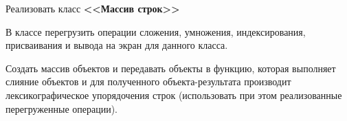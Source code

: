Реализовать класс \textbf{<<Массив строк>>}

В классе перегрузить операции сложения, умножения, индексирования,
присваивания и вывода на экран для данного класса.

Создать массив объектов и
передавать объекты в функцию, которая выполняет слияние объектов и для полученного
объекта-результата производит лексикографическое упорядочения строк (использовать
при этом реализованные перегруженные операции).

